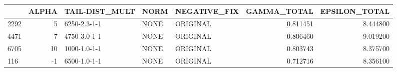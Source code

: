 \begin{tabular}{lrlllrr}
\toprule
 & ALPHA & TAIL-DIST_MULT & NORM & NEGATIVE_FIX & GAMMA_TOTAL & EPSILON_TOTAL \\
\midrule
2292 & 5 & 6250-2.3-1-1 & NONE & ORIGINAL & 0.811451 & 8.444800 \\
4471 & 7 & 4750-3.0-1-1 & NONE & ORIGINAL & 0.806460 & 9.019200 \\
6705 & 10 & 1000-1.0-1-1 & NONE & ORIGINAL & 0.803743 & 8.375700 \\
116 & -1 & 6500-1.0-1-1 & NONE & ORIGINAL & 0.712716 & 8.356100 \\
\bottomrule
\end{tabular}
